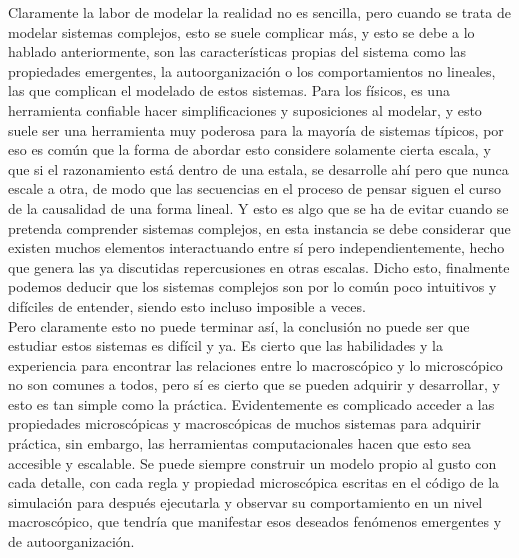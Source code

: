 Claramente la labor de modelar la realidad no es sencilla, pero cuando se trata de modelar sistemas complejos, esto se suele complicar más, y esto se debe a lo hablado anteriormente, son las características propias del sistema como las propiedades emergentes, la autoorganización o los comportamientos no lineales, las que complican el modelado de estos sistemas. Para los físicos, es una herramienta confiable hacer simplificaciones y suposiciones al modelar, y esto suele ser una herramienta muy poderosa para la mayoría de sistemas típicos, por eso es común que la forma de abordar esto considere solamente cierta escala, y que si el razonamiento está dentro de una estala, se desarrolle ahí pero que nunca escale a otra, de modo que las secuencias en el proceso de pensar siguen el curso de la causalidad de una forma lineal. Y esto es algo que se ha de evitar cuando se pretenda comprender sistemas complejos, en esta instancia se debe considerar que existen muchos elementos interactuando entre sí pero independientemente, hecho que genera las ya discutidas repercusiones en otras escalas. Dicho esto, finalmente podemos deducir que los sistemas complejos son por lo común poco intuitivos y difíciles de entender, siendo esto incluso imposible a veces.\\
Pero claramente esto no puede terminar así, la conclusión no puede ser que estudiar estos sistemas es difícil y ya. Es cierto que las habilidades y la experiencia para encontrar las relaciones entre lo macroscópico y lo microscópico no son comunes a todos, pero sí es cierto que se pueden adquirir y desarrollar, y esto es tan simple como la práctica. Evidentemente es complicado acceder a las propiedades microscópicas y macroscópicas de muchos sistemas para adquirir práctica, sin embargo, las herramientas computacionales hacen que esto sea accesible y escalable. Se puede siempre construir un modelo propio al gusto con cada detalle, con cada regla y propiedad microscópica escritas en el código de la simulación para después ejecutarla y observar su comportamiento en un nivel macroscópico, que tendría que manifestar esos deseados fenómenos emergentes y de autoorganización.\\
